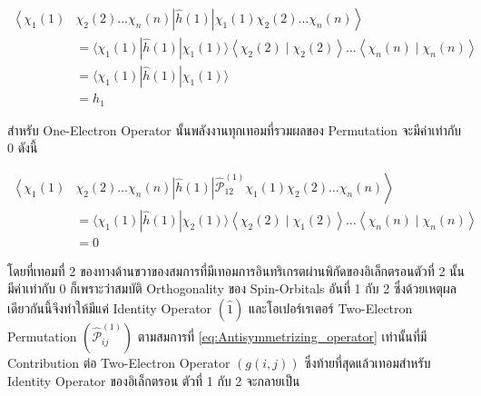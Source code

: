 \begin{equation}
    \begin{aligned}
        \left\langle \right. \chi_1(1) & \chi_2(2) \dots \chi_n(n)
        |\hat{h}(1)|
        \chi_1(1) \chi_2(2) \dots \chi_n(n) \left. \right\rangle   \\
                                       & = \langle\chi_1(1)
        |\hat{h}(1)|
        \chi_1(1)\rangle\left\langle\chi_2(2) \mid \chi_2(2)\right\rangle
        \dots\left\langle\chi_n(n) \mid \chi_n(n)\right\rangle     \\
                                       & = \langle\chi_1(1)
        |\hat{h}(1)|
        \chi_1(1)\rangle                                           \\
                                       & = h_1
    \end{aligned}
\end{equation}

\noindent สำหรับ One-Electron Operator นั้นพลังงานทุกเทอมที่รวมผลของ Permutation จะมีค่าเท่ากับ 0 ดังนี้

\begin{equation}
    \begin{aligned}
        \left\langle \right. \chi_1(1) & \chi_2(2) \dots \chi_n(n)
        |\hat{h}(1)|
        \hat{\mathscr{P}}_{12}^{(1)} \chi_1(1) \chi_2(2) \dots \chi_n(n) \left. \right\rangle \\
                                       & = \langle\chi_1(1)
        |\hat{h}(1)|
        \chi_2(1)\rangle\left\langle\chi_2(2) \mid \chi_1(2)\right\rangle
        \dots\left\langle\chi_n(n) \mid \chi_n(n)\right\rangle                                \\
                                       & = 0
    \end{aligned}
\end{equation}

\noindent โดยที่เทอมที่ 2 ของทางด้านขวาของสมการที่มีเทอมการอินทริเกรตผ่านพิกัดของอิเล็กตรอนตัวที่ 2 นั้นมีค่าเท่ากับ 0 ก็เพราะว่าสมบัติ
Orthogonality ของ Spin-Orbitals อันที่ 1 กับ 2 ซึ่งด้วยเหตุผลเดียวกันนี้จึงทำให้มีแค่ Identity Operator $(\hat{1})$
และโอเปอร์เรเตอร์ Two-Electron Permutation $(\hat{\mathscr{P}}_{i j}^{(1)})$ ตามสมการที่ \eqref{eq:Antisymmetrizing_operator}
เท่านั้นที่มี Contribution ต่อ Two-Electron Operator $(g(i, j))$ ซึ่งท้ายที่สุดแล้วเทอมสำหรับ Identity Operator ของอิเล็กตรอน%
ตัวที่ 1 กับ 2 จะกลายเป็น

